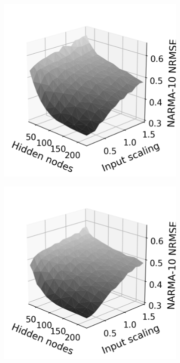 \begin{figure}[t]
  \centering
  \begin{subfigure}{.32\textwidth}
    \centering
    \includegraphics[width=1.0\linewidth]{figures/regular-tilings-performance-is-sq.png}
    \caption{}
    \label{fig:rt-is-square}
  \end{subfigure}
  \begin{subfigure}{.32\textwidth}
    \centering
    \includegraphics[width=1.0\linewidth]{figures/regular-tilings-performance-is-hex.png}

\end{subfigure}
\end{figure}
